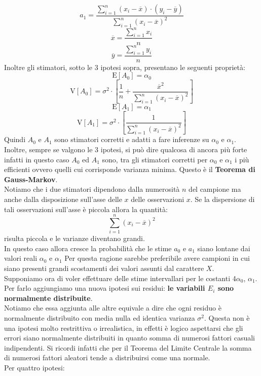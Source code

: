\documentclass[a4paper,12pt, oneside]{book}
\begin{document}
\[a_{1}=\frac{\sum_{i=1}^{n}\left(x_{i}-\overline{x}\right) \cdot\left(y_{i}-\overline{y}\right)}{\sum_{i=1}^{n}\left(x_{i}-\overline{x}\right)^{2}}\]
\[\overline{x}=\frac{\sum_{i=1}^{n} x_{i}}{n}\]
\[\overline{y}=\frac{\sum_{i=1}^{n} y_{i}}{n}\]
Inoltre gli stimatori, sotto le 3 ipotesi sopra, presentano le seguenti proprietà:
\[\mathrm{E}\left[A_{0}\right]=\alpha_{0}\]
\[\mathrm{V}\left[A_{0}\right]=\sigma^{2} \cdot\left[\frac{1}{n}+\frac{\overline{x}^{2}}{\sum_{i=1}^{n}\left(x_{i}-\overline{x}\right)^{2}}\right]\]
\[\mathrm{E}\left[A_{1}\right]=\alpha_{1}\]
\[\mathrm{V}\left[A_{1}\right]=\sigma^{2} \cdot\left[\frac{1}{\sum_{i=1}^{n}\left(x_{i}-\overline{x}\right)^{2}}\right]\]
Quindi $A_0$ e $A_1$ sono stimatori corretti e adatti a fare inferenze su $\alpha_0$ e $\alpha_1$.\\
Inoltre, sempre se valgono le 3 ipotesi, si può dire qualcosa di ancora più forte infatti in questo caso $A_0$ ed $A_1$ sono, tra gli
stimatori corretti per $\alpha_0$ e $\alpha_1$
i più efficienti ovvero quelli cui corrisponde varianza minima. Questo è il \textbf{Teorema di Gauss-Markov}.\\
Notiamo che i due stimatori dipendono dalla numerosità $n$ del campione ma anche dalla disposizione sull’asse delle $x$ delle osservazioni $x$. Se la dispersione di tali osservazioni sull’asse è piccola allora la quantità:
\[\sum_{i=1}^{n}\left(x_{i}-\overline{x}\right)^{2}\]
risulta piccola e le varianze diventano grandi.\\
In questo caso allora cresce la probabilità che le stime
$a_0$ e $a_1$ siano lontane dai valori reali $\alpha_0$ e $\alpha_1$
Per questa ragione sarebbe preferibile avere campioni in cui siano presenti grandi scostamenti
dei valori assunti dal carattere $X$.\\
Supponiamo ora di voler effettuare delle stime intervallari per le costanti 4$\alpha_0$, $\alpha_1$. Per farlo aggiungiamo una nuova ipotesi sui residui:
\textbf{le variabili $E_i$ sono normalmente distribuite}.\\
Notiamo che essa aggiunta alle altre equivale a dire che ogni residuo è normalmente
distribuito con media nulla ed identica varianza $\sigma^2$.
Questa non è una ipotesi molto restrittiva o irrealistica, in effetti è logico aspettarsi
che gli errori siano normalmente distribuiti in quanto somma di numerosi fattori
casuali indipendenti.
Si ricordi infatti che per il Teorema del Limite Centrale la somma di numerosi fattori
aleatori tende a distribuirsi come una normale.\\Per quattro ipotesi:
\end{document}
